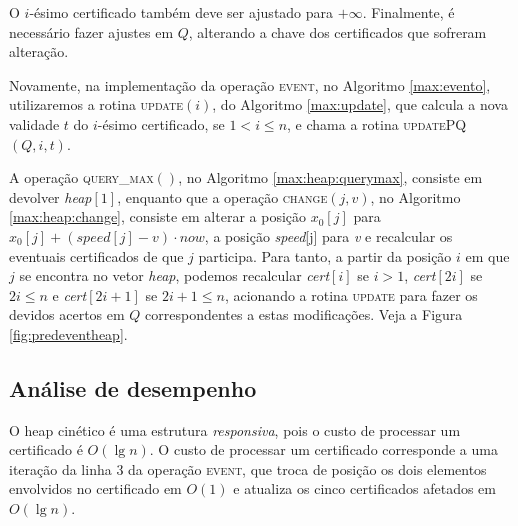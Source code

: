 

O $i$-ésimo certificado também deve ser ajustado para $+\infty$. Finalmente, é
necessário fazer ajustes em $Q$, alterando a chave dos certificados que sofreram
alteração.



Novamente, na implementação da operação \textsc{event}, no Algoritmo
\ref{max:evento}, utilizaremos a rotina \textsc{update}$(i)$, do Algoritmo
\ref{max:update}, que calcula a nova validade $t$ do $i$-ésimo certificado, se
$1 < i \leq n$, e chama a rotina \textsc{updatePQ}$(Q, i, t)$.





A operação \textsc{query\_max}$()$, no Algoritmo \ref{max:heap:querymax},
consiste em devolver \textit{heap}$[1]$, enquanto que a operação
\textsc{change}$(j, v)$, no Algoritmo \ref{max:heap:change}, consiste em alterar
a posição $x_0[j]$ para ${x_0[j] + (\mathit{speed}[j] - v)\cdot now}$, a posição
\textit{speed}[j] para \textit{v} e recalcular os eventuais certificados de que
$j$ participa. Para tanto, a partir da posição $i$ em que $j$ se encontra no
vetor \textit{heap}, podemos recalcular \textit{cert}$[i]$ se $i > 1$,
\textit{cert}$[2i]$ se $2i \leq n$ e \textit{cert}$[2i + 1]$ se $2i + 1 \leq n$,
acionando a rotina \textsc{update} para fazer os devidos acertos em $Q$
correspondentes a estas modificações. Veja a Figura \ref{fig:predeventheap}.







\FloatBarrier
\subsection{Análise de desempenho}

O heap cinético é uma estrutura \textit{responsiva}, pois o custo de processar
um certificado é $O(\lg{n})$. O custo de processar um certificado corresponde a
uma iteração da linha $3$ da operação \textsc{event}, que troca de posição os
dois elementos envolvidos no certificado em $O(1)$ e atualiza os cinco
certificados afetados em $O(\lg{n})$.

